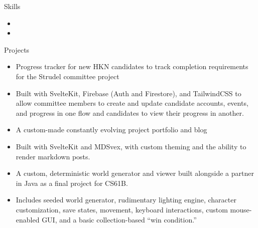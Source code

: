 \documentclass[10pt]{article}
\begin{document}
\begin{section}{Skills}
    \begin{itemize}
        \item {}
        \item {}
    \end{itemize}
\end{section}

\begin{section}{Projects}
    \begin{sectionitem}[
        Title={Studrel Candidate Semester Tracker},
        TitleLink={https://github.com/jonahbedouch/studrel}, 
        Date={October 2023}, 
        ]
        \begin{itemize}
            \item Progress tracker for new HKN candidates to track completion requirements for the Strudel committee project
            \item Built with SvelteKit, Firebase (Auth and Firestore), and TailwindCSS to allow committee members to create and update candidate accounts, events, and progress in one flow and candidates to view their progress in another.
        \end{itemize}
    \end{sectionitem}

    \begin{sectionitem}[
        Title={Bedouch.net},
        TitleLink={https://bedouch.net}, 
        Date={December 2022}, 
        ]
        \begin{itemize}
            \item A custom-made constantly evolving project portfolio and blog
            \item Built with SvelteKit and MDSvex, with custom theming and the ability to render markdown posts.
        \end{itemize}
    \end{sectionitem}

    \begin{sectionitem}[
        Title={Build Your Own World (CS61B)},
        TitleLink={https://www.youtube.com/watch?v=CfOpw9so67s}, 
        Date={December 2022}, 
        ]
        \begin{itemize}
            \item A custom, deterministic world generator and viewer built alongside a partner in Java as a final project for CS61B.
            \item Includes seeded world generator, rudimentary lighting engine, character customization, save states, movement, keyboard interactions, custom mouse-enabled GUI, and a basic collection-based ``win condition.''
        \end{itemize}
    \end{sectionitem}
\end{section}
\end{document}
